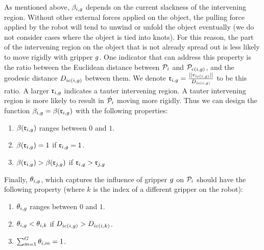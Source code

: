 As mentioned above, $\beta_{i, g}$ depends on the current slackness of the intervening region. Without other external forces applied on the object, the pulling force applied by the robot will tend to unwind or unfold the object eventually (we do not consider cases where the object is tied into knots). For this reason,  the part of the intervening region on the object that is not already spread out is less likely to move rigidly with gripper $g$. One indicator that can address this property is the ratio between the Euclidean distance between $\mathcal{P}_i$ and $\mathcal{P}_{c(i, g)}$, and the geodesic distance $D_{i c(i, g)}$ between them. We denote $\mathfrak{r}_{i, g} = \frac{||v_{i c(i, g)}||}{D_{i c(i, g)}}$ to be this ratio. A larger $\mathfrak{r}_{i, g}$ indicates a tauter intervening region. A tauter intervening region is more likely to result in $\dot{\mathcal{P}_i}$ moving more rigidly. Thus we can design the function $\beta_{i, g} = \beta(\mathfrak{r}_{i, g})$ with the following properties:
\begin{enumerate}
    \item $\beta(\mathfrak{r}_{i, g})$ ranges between $0$ and $1$.
    \item $\beta(\mathfrak{r}_{i, g}) = 1$ if $\mathfrak{r}_{i, g} = 1$.
    \item $\beta(\mathfrak{r}_{i, g}) > \beta(\mathfrak{r}_{j, g})$ if $\mathfrak{r}_{i, g} > \mathfrak{r}_{j, g}$
\end{enumerate}

Finally, $\theta_{i, g}$, which captures the influence of gripper $g$ on $\mathcal{P}_i$ should have the following property (where $k$ is the index of a different gripper on the robot):
\begin{enumerate}
    \item $\theta_{i, g}$ ranges between $0$ and $1$.
    \item $\theta_{i, g} < \theta_{i, k}$ if $D_{i c(i, g)} > D_{i c(i, k)}$.
    \item $\sum_{m = 1}^{G} \theta_{i, m} = 1$.
\end{enumerate}




